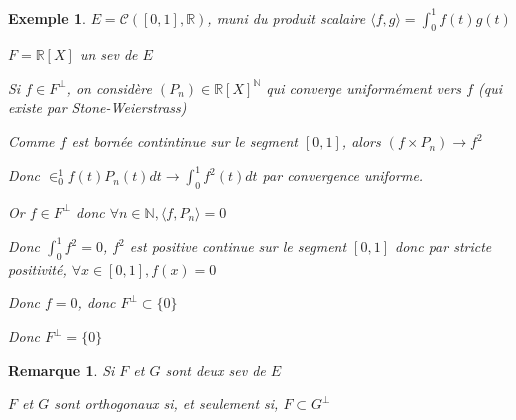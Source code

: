 \documentclass[a4paper,12pt]{book}
\newtheorem{Exe}{Exemple}[section]
\newtheorem{Rem}{Remarque}[section]
\def\R{\mathbb{R}}
\def\N{\mathbb{N}}
\begin{document}
\begin{Exe}
$E =\mathcal{C}([0,1],\R)$, muni du produit scalaire $\langle f,g\rangle = \int_0^1f(t)g(t)$
\par $F = \R[X]$ un sev de $E$
\par Si $f\in F^\perp$, on considère $(P_n)\in \R[X]^\N$ qui converge uniformément vers $f$ (qui existe par Stone-Weierstrass)
\par Comme $f$ est bornée contintinue sur le segment $[0,1]$, alors $(f\times P_n) \to f^2$
\par Donc $\in_0^1f(t)P_n(t)dt \to \int_0^1f^2(t)dt$ par convergence uniforme.
\par Or $f\in F^\perp$ donc $\forall n\in\N, \langle f, P_n\rangle = 0$
\par Donc $\int_0^1f^2 = 0$, $f^2$ est positive continue sur le segment $[0,1]$ donc par stricte positivité, $\forall x\in[0,1], f(x)=0$
\par Donc $f=0$, donc $F^\perp \subset \{0\}$
\par Donc $F^\perp=\{0\}$
\end{Exe}

\begin{Rem}
Si $F$ et $G$ sont deux sev de $E$
\par $F$ et $G$ sont orthogonaux si, et seulement si, $F\subset G^\perp$
\end{Rem}
\end{document}

